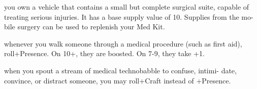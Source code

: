 \begin{dossier}
\begin{dossiermovebar}
\begin{moveoptions}


\end{moveoptions}
 you own a vehicle that contains a small but complete surgical suite,
capable of treating serious injuries. It has a base supply value of 10. Supplies from the mo-
bile surgery can be used to replenish your Med Kit.

 whenever you walk someone through a medical procedure (such as first
aid), roll+Presence. On 10+, they are boosted. On 7-9, they take +1.

 when you spout a stream of medical technobabble to confuse, intimi-
date, convince, or distract someone, you may roll+Craft instead of +Presence.



\end{dossiermovebar}%
\end{dossier}

